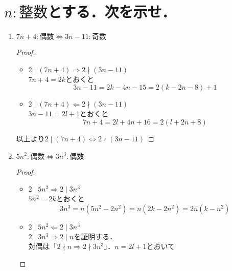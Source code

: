 \documentclass[a4paper,12pt]{ltjsarticle}
\begin{document}
\section{$n:整数$とする．次を示せ．}
\begin{enumerate}[(1)]
    \item $7n + 4 : 偶数 \Leftrightarrow 3n - 11 : 奇数$
        \begin{proof}
            \quad \\
            \begin{itemize}
                \item $2 \mid (7n + 4) \Rightarrow 2 \nmid (3n - 11)$ \\
                    $7n + 4 = 2k$とおくと
                    \begin{equation*}
                        3n - 11 = 2k - 4n - 15 = 2(k - 2n - 8) + 1
                    \end{equation*}
                \item $2 \mid (7n + 4) \Leftarrow 2 \nmid (3n - 11)$ \\
                    $3n - 11 = 2l + 1$とおくと
                    \begin{equation*}
                        7n + 4 = 2l + 4n + 16 = 2(l + 2n + 8)
                    \end{equation*}
            \end{itemize}
            以上より$2 \mid (7n + 4) \Leftrightarrow 2 \nmid (3n - 11)$
        \end{proof}
    \item $5n^2 : 偶数 \Leftrightarrow 3n^3 : 偶数$
        \begin{proof}
            \quad \\
            \begin{itemize}
                \item $2 \mid 5n^2 \Rightarrow 2 \mid 3n^3$ \\
                    $5n^2 = 2k$とおくと
                    \begin{equation*}
                        3n^3 = n(5n^2 - 2n^2) = n(2k - 2n^2) = 2n(k - n^2)
                    \end{equation*}
                \item $2 \mid 5n^2 \Leftarrow 2 \mid 3n^3$ \\
                    $2 \mid 3n^3 \Rightarrow 2 \mid n$を証明する． \\
                    対偶は「$2 \nmid n \Rightarrow 2 \nmid 3n^3$」．$n = 2l + 1$とおいて

\end{itemize}
\end{proof}
\end{enumerate}
\end{document}
